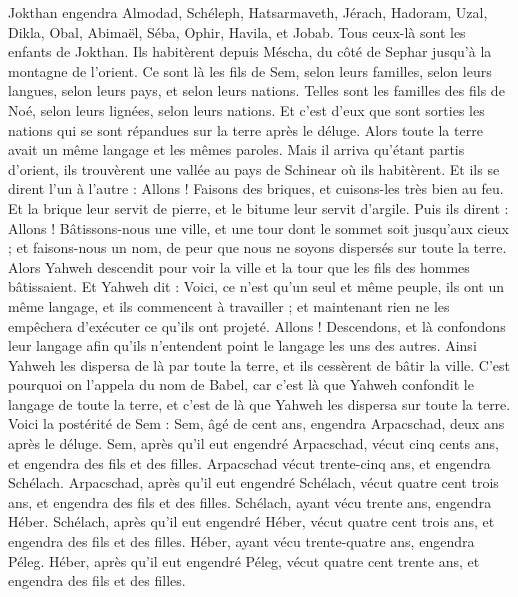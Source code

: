 \begin{multicols}{2}
Jokthan engendra Almodad, Schéleph, Hatsarmaveth, Jérach,
Hadoram, Uzal, Dikla,
Obal, Abimaël, Séba,
Ophir, Havila, et Jobab. Tous ceux-là sont les enfants de Jokthan.
Ils habitèrent depuis Méscha, du côté de Sephar jusqu’à la montagne de l’orient.
Ce sont là les fils de Sem, selon leurs familles, selon leurs langues, selon leurs pays, et selon leurs nations.
Telles sont les familles des fils de Noé, selon leurs lignées, selon leurs nations. Et c’est d’eux que sont sorties les nations qui se sont répandues sur la terre après le déluge.
\VerseOne{}Alors toute la terre avait un même langage et les mêmes paroles.
Mais il arriva qu'étant partis d'orient, ils trouvèrent une vallée au pays de Schinear où ils habitèrent.
Et ils se dirent l'un à l'autre : Allons ! Faisons des briques, et cuisons-les très bien au feu. Et la brique leur servit de pierre, et le bitume leur servit d’argile.
Puis ils dirent : Allons ! Bâtissons-nous une ville, et une tour dont le sommet soit jusqu’aux cieux ; et faisons-nous un nom, de peur que nous ne soyons dispersés sur toute la terre.
Alors Yahweh descendit pour voir la ville et la tour que les fils des hommes bâtissaient.
Et Yahweh dit : Voici, ce n'est qu'un seul et même peuple, ils ont un même langage, et ils commencent à travailler ; et maintenant rien ne les empêchera d'exécuter ce qu'ils ont projeté.
Allons ! Descendons, et là confondons leur langage afin qu'ils n'entendent point le langage les uns des autres.
Ainsi Yahweh les dispersa de là par toute la terre, et ils cessèrent de bâtir la ville.
C'est pourquoi on l’appela du nom de Babel, car c’est là que Yahweh confondit le langage de toute la terre, et c’est de là que Yahweh les dispersa sur toute la terre.
Voici la postérité de Sem : Sem, âgé de cent ans, engendra Arpacschad, deux ans après le déluge.
Sem, après qu'il eut engendré Arpacschad, vécut cinq cents ans, et engendra des fils et des filles.
Arpacschad vécut trente-cinq ans, et engendra Schélach.
Arpacschad, après qu'il eut engendré Schélach, vécut quatre cent trois ans, et engendra des fils et des filles.
Schélach, ayant vécu trente ans, engendra Héber.
Schélach, après qu'il eut engendré Héber, vécut quatre cent trois ans, et engendra des fils et des filles.
Héber, ayant vécu trente-quatre ans, engendra Péleg.
Héber, après qu'il eut engendré Péleg, vécut quatre cent trente ans, et engendra des fils et des filles.

\end{multicols}
